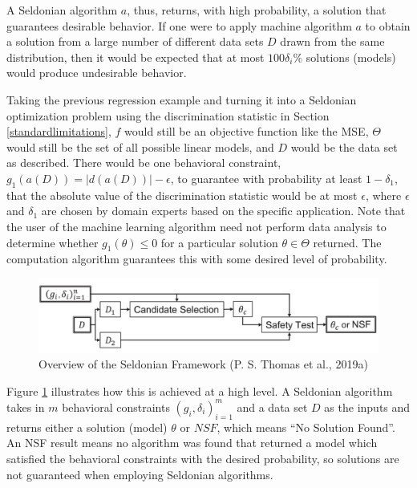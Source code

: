 \documentclass[12pt, twoside]{amherstthesis}
\begin{document}
A Seldonian algorithm \(a\), thus, returns, with high probability, a solution that guarantees desirable behavior. If one were to apply machine algorithm \(a\) to obtain a solution from a large number of different data sets \(D\) drawn from the same distribution, then it would be expected that at most \(100\delta_i \%\) solutions (models) would produce undesirable behavior.

Taking the previous regression example and turning it into a Seldonian optimization problem using the discrimination statistic in Section \ref{standardlimitations}, \(f\) would still be an objective function like the MSE, \(\Theta\) would still be the set of all possible linear models, and \(D\) would be the data set as described. There would be one behavioral constraint, \(g_1(a(D)) = |d(a(D))| - \epsilon\), to guarantee with probability at least \(1-\delta_1\), that the absolute value of the discrimination statistic would be at most \(\epsilon\), where \(\epsilon\) and \(\delta_1\) are chosen by domain experts based on the specific application. Note that the user of the machine learning algorithm need not perform data analysis to determine whether \(g_1(\theta) \leq 0\) for a particular solution \(\theta \in \Theta\) returned. The computation algorithm guarantees this with some desired level of probability.
\begin{figure}

{\centering \includegraphics[width=1\linewidth]{figures/seldonian1} 

}

\caption[Overview of the Seldonian Framework]{Overview of the Seldonian Framework (P. S. Thomas et al., 2019a)}\label{fig:seldonian1}
\end{figure}
Figure \ref{fig:seldonian1} illustrates how this is achieved at a high level. A Seldonian algorithm takes in \(m\) behavioral constraints \((g_i,\delta_i)_{i=1}^m\) and a data set \(D\) as the inputs and returns either a solution (model) \(\theta\) or \(NSF\), which means ``No Solution Found''. An NSF result means no algorithm was found that returned a model which satisfied the behavioral constraints with the desired probability, so solutions are not guaranteed when employing Seldonian algorithms.
\end{document}
